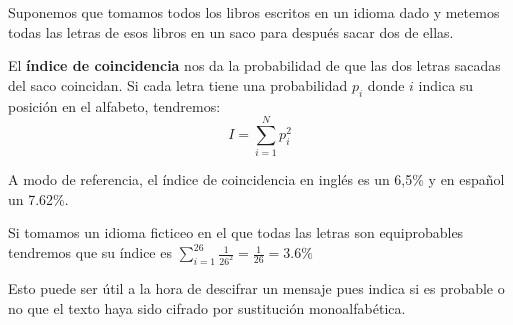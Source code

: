 \begin{defn}
Suponemos que tomamos todos los libros escritos en un idioma dado y metemos todas las letras de esos libros en un saco para después sacar dos de ellas.

El \textbf{índice de coincidencia} nos da la probabilidad de que las dos letras sacadas del saco coincidan. Si cada letra tiene una probabilidad $p_i$ donde $i$ indica su posición en el alfabeto, tendremos:
\[I = \sum_{i=1}^N p_i^2\]

A modo de referencia, el índice de coincidencia en inglés es un 6,5\% y en español un 7.62\%.

Si tomamos un idioma ficticeo en el que todas las letras son equiprobables tendremos que su índice es $\sum_{i=1}^{26}\frac{1}{26^2} = \frac{1}{26} = 3.6\%$
\end{defn}

Esto puede ser útil a la hora de descifrar un mensaje pues indica si es probable o no que el texto haya sido cifrado por sustitución monoalfabética.